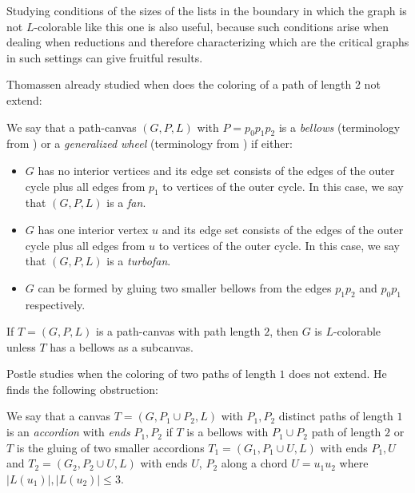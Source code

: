 Studying conditions of the sizes of the lists in the boundary in which the graph is not $L$-colorable like this one is also useful, because such conditions arise when dealing when reductions and therefore characterizing which are the critical graphs in such settings can give fruitful results.

Thomassen already studied when does the coloring of a path of length $2$ not extend:

\begin{definition}[Bellows]
	We say that a path-canvas $(G, P, L)$ with $P = p_0p_1p_2$ is a \emph{bellows} (terminology from \cite{postlethesis}) or a \emph{generalized wheel} (terminology from \cite{thomassenexponentiallymany5listcolorings}) if either:
	\begin{itemize}
		\item $G$ has no interior vertices and its edge set consists of the edges of the outer cycle plus all edges from $p_1$ to vertices of the outer cycle. In this case, we say that $(G, P, L)$ is a \emph{fan}.
		\item $G$ has one interior vertex $u$ and its edge set consists of the edges of the outer cycle plus all edges from $u$ to vertices of the outer cycle. In this case, we say that $(G, P, L)$ is a \emph{turbofan}.
		\item $G$ can be formed by gluing two smaller bellows from the edges $p_1p_2$ and $p_0p_1$ respectively. 
	\end{itemize}
\end{definition}



\begin{theorem}
	If $T = (G, P, L)$ is a path-canvas with path length $2$, then $G$ is $L$-colorable unless $T$ has a bellows as a subcanvas.
\end{theorem}

Postle studies when the coloring of two paths of length $1$ does not extend. He finds the following obstruction:

\begin{definition}[Accordion]
	We say that a canvas $T = (G, P_1 \cup P_2, L)$ with $P_1, P_2$ distinct paths of length $1$ is an \emph{accordion} with \emph{ends} $P_1, P_2$ if $T$ is a bellows with $P_1 \cup P_2$ path of length $2$ or $T$ is the gluing of two smaller accordions $T_1 = (G_1, P_1 \cup U, L)$ with ends $P_1, U$ and $T_2 = (G_2, P_2 \cup U, L)$ with ends $U$, $P_2$ along a chord $U = u_1u_2$ where $|L(u_1)|, |L(u_2)| \leq 3$.
\end{definition}


